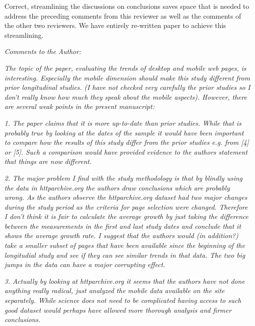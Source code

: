 \documentclass[11pt, draftclsnofoot, onecolumn]{IEEEtran}
\begin{document}
{{Correct, streamlining the discussions on conclusions saves space that
is needed to address the preceding comments from this reviewer as well
as the comments of the other two reviewers. We have entirely
re-written paper to achieve this streamlining.\\




\noindent \textit{Comments to the Author: }

\noindent \textit{
The topic of the paper, evaluating the trends of desktop and mobile web pages, is interesting. Especially the mobile dimension should make this study different from prior longitudinal studies. (I have not checked very carefully the prior studies so I don't really know how much they speak about the mobile aspects). However, there are several weak points in the present manuscript:
}

\noindent \textit{1. The paper claims that it is more up-to-date than prior studies. While that is probably true by looking at the dates of the sample it would have been important to compare how the results of this study differ from the prior studies e.g. from [4] or [5]. Such a comparison would have provided evidence to the authors statement that things are now different.}

\noindent \textit{2. The major problem I find with the study methodology is that by blindly using the data in httparchive.org the authors draw conclusions which are probably wrong. As the authors observe the httparchive.org dataset had two major changes during the study period as the criteria for page selection were changed. Therefore I don't think it is fair to calculate the average growth by just taking the difference between the measurements in the first and last study dates and conclude that it shows the average growth rate. I suggest that the authors would (in addition?) take a smaller subset of pages that have been available since the beginning of the longitudial study and see if they can see similar trends in that data. The two big jumps in the data can have a major corrupting effect.}


\noindent \textit{3. Actually by looking at httparchive.org it seems that the authors have not done anything really radical, just analyzed the mobile data available on the site separately. While science does not need to be complicated having access to such good dataset would perhaps have allowed more thorough analysis and firmer conclusions.}

}}
\end{document}

